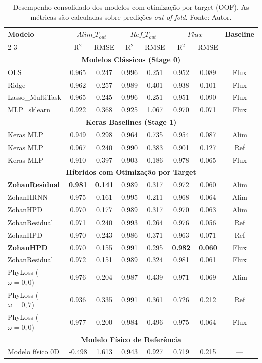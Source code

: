 \begin{table}[H]
\centering
\caption[Desempenho consolidado dos modelos]{Desempenho consolidado dos modelos com otimização por target (OOF). As métricas são calculadas sobre predições \textit{out-of-fold}. Fonte: Autor.}
\label{tab:resultados_consolidados}
\begin{tabular}{l c c c c c c c}
\hline
\textbf{Modelo} &
\multicolumn{2}{c}{\textbf{$Alim\_T_{out}$}} &
\multicolumn{2}{c}{\textbf{$Ref\_T_{out}$}} &
\multicolumn{2}{c}{\textbf{$Flux$}} &
\textbf{Baseline} \\
\cline{2-3} \cline{4-5} \cline{6-7}
 & R$^2$ & RMSE & R$^2$ & RMSE & R$^2$ & RMSE & \\
\hline
\multicolumn{8}{c}{\textbf{Modelos Clássicos (Stage 0)}} \\
\hline
OLS & 0.965 & 0.247 & 0.996 & 0.251 & 0.952 & 0.089 & Flux \\
Ridge & 0.962 & 0.257 & 0.989 & 0.401 & 0.938 & 0.101 & Flux \\
Lasso\_MultiTask & 0.965 & 0.245 & 0.996 & 0.251 & 0.951 & 0.090 & Flux \\
MLP\_sklearn & 0.922 & 0.368 & 0.925 & 1.067 & 0.970 & 0.071 & Flux \\
\hline
\multicolumn{8}{c}{\textbf{Keras Baselines (Stage 1)}} \\
\hline
Keras MLP & 0.949 & 0.298 & 0.964 & 0.735 & 0.954 & 0.087 & Alim \\
Keras MLP & 0.967 & 0.240 & 0.990 & 0.383 & 0.901 & 0.127 & Ref \\
Keras MLP & 0.910 & 0.397 & 0.903 & 0.186 & 0.978 & 0.065 & Flux \\
\hline
\multicolumn{8}{c}{\textbf{Híbridos com Otimização por Target}} \\
\hline
\rowcolor{orange!15}
\textbf{ZohanResidual} & \textbf{0.981} & \textbf{0.141} & 0.989 & 0.317 & 0.972 & 0.060 & Alim \\
ZohanHRNN & 0.975 & 0.161 & 0.995 & 0.211 & 0.968 & 0.064 & Alim \\
ZohanHPD & 0.970 & 0.177 & 0.989 & 0.317 & 0.970 & 0.063 & Alim \\
ZohanResidual & 0.971 & 0.240 & 0.993 & 0.264 & 0.976 & 0.056 & Ref \\
ZohanHPD & 0.970 & 0.243 & 0.986 & 0.371 & 0.963 & 0.071 & Ref \\
\rowcolor{green!15}
\textbf{ZohanHPD} & 0.970 & 0.155 & 0.991 & 0.295 & \textbf{0.982} & \textbf{0.060} & Flux \\
ZohanResidual & 0.972 & 0.151 & 0.989 & 0.324 & 0.981 & 0.061 & Flux \\
PhyLoss ($\omega{=}0{,}0$) & 0.976 & 0.204 & 0.987 & 0.439 & 0.971 & 0.069 & Alim \\
PhyLoss ($\omega{=}0{,}7$) & 0.936 & 0.335 & 0.991 & 0.361 & 0.726 & 0.212 & Ref \\
PhyLoss ($\omega{=}0{,}0$) & 0.977 & 0.200 & 0.984 & 0.496 & 0.975 & 0.064 & Flux \\
\hline
\multicolumn{8}{c}{\textbf{Modelo Físico de Referência}} \\
\hline
Modelo físico 0D & -0.498 & 1.613 & 0.943 & 0.927 & 0.719 & 0.215 & --- \\
\hline
\end{tabular}
\end{table}